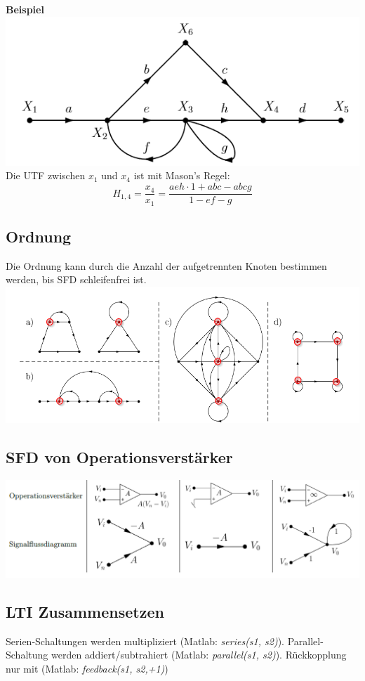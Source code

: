 \textbf{Beispiel}\\
\includegraphics[width=\columnwidth]{Images/sfd_beispiel}
Die UTF zwischen $x_1$ und $x_4$ ist mit Mason's Regel:
\[
H_{1,4} = \frac{x_4}{x_1} = \frac{aeh \cdot 1 + abc - abcg}{1 - ef - g}
\]

\subsection{Ordnung}
Die Ordnung kann durch die Anzahl der aufgetrennten Knoten bestimmen werden, bis SFD schleifenfrei ist.\\
\includegraphics[width=\columnwidth]{Images/sfd_ordnung}


\subsection{SFD von Operationsverstärker}
\includegraphics[width=\columnwidth]{"./Images/sfd_op"}


\subsection{LTI Zusammensetzen}
Serien-Schaltungen werden multipliziert (Matlab: \textit{series(s1, s2)}). Parallel-Schaltung werden addiert/subtrahiert (Matlab: \textit{parallel(s1, s2)}). Rückkopplung nur mit (Matlab: \textit{feedback(s1, s2,+1)})